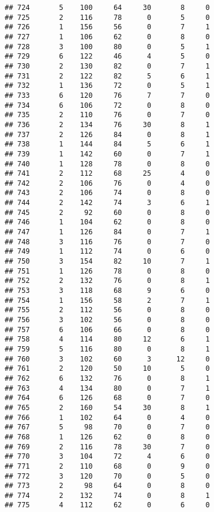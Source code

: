 \documentclass[
]{article}
\begin{document}
\begin{verbatim}
## 724       5    100     64     30       8     0
## 725       2    116     78      0       5     0
## 726       1    156     56      0       7     1
## 727       1    106     62      0       8     0
## 728       3    100     80      0       5     1
## 729       6    122     46      4       5     0
## 730       2    130     82      0       7     1
## 731       2    122     82      5       6     1
## 732       1    136     72      0       5     1
## 733       6    120     76      7       7     0
## 734       6    106     72      0       8     0
## 735       2    110     76      0       7     0
## 736       2    134     76     30       8     1
## 737       2    126     84      0       8     1
## 738       1    144     84      5       6     1
## 739       1    142     60      0       7     1
## 740       1    128     78      0       8     0
## 741       2    112     68     25       4     0
## 742       2    106     76      0       4     0
## 743       2    106     74      0       8     0
## 744       2    142     74      3       6     1
## 745       2     92     60      0       8     0
## 746       1    104     62      0       8     0
## 747       1    126     84      0       7     1
## 748       3    116     76      0       7     0
## 749       1    112     74      0       6     0
## 750       3    154     82     10       7     1
## 751       1    126     78      0       8     0
## 752       2    132     76      0       8     1
## 753       3    118     68      9       6     0
## 754       1    156     58      2       7     1
## 755       2    112     56      0       8     0
## 756       3    102     56      0       8     0
## 757       6    106     66      0       8     0
## 758       4    114     80     12       6     1
## 759       5    116     80      0       8     1
## 760       3    102     60      3      12     0
## 761       2    120     50     10       5     0
## 762       6    132     76      0       8     1
## 763       4    134     80      0       7     1
## 764       6    126     68      0       7     0
## 765       2    160     54     30       8     1
## 766       1    102     64      0       4     0
## 767       5     98     70      0       7     0
## 768       1    126     62      0       8     0
## 769       2    116     78     30       7     0
## 770       3    104     72      4       6     0
## 771       2    110     68      0       9     0
## 772       3    120     70      0       5     0
## 773       2     98     64      0       8     0
## 774       2    132     74      0       8     1
## 775       4    112     62      0       6     0

\end{verbatim}
\end{document}
